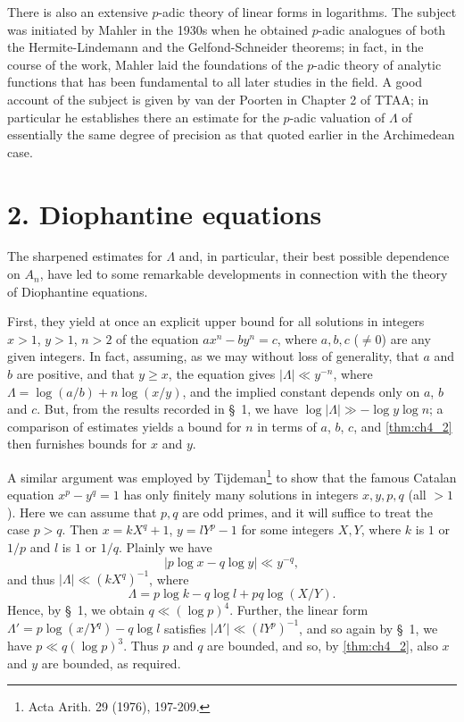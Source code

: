 There is also an extensive \(p\)-adic theory of linear forms in logarithms. The subject was initiated by Mahler in the 1930s when he obtained \(p\)-adic analogues of both the Hermite-Lindemann and the Gelfond-Schneider theorems; in fact, in the course of the work, Mahler laid the foundations of the \(p\)-adic theory of analytic functions that has been fundamental to all later studies in the field. A good account of the subject is given by van der Poorten in Chapter 2 of TTAA; in particular he establishes there an estimate for the \(p\)-adic valuation of \(\Lambda\) of essentially the same degree of precision as that quoted earlier in the Archimedean case.

\section*{2. Diophantine equations}

The sharpened estimates for \(\Lambda\) and, in particular, their best possible dependence on \(A_n\), have led to some remarkable developments in connection with the theory of Diophantine equations.

First, they yield at once an explicit upper bound for all solutions in integers \(x>1\), \(y>1\), \(n>2\) of the equation \(ax^n-by^n=c\), where \(a,b,c\) (\(\neq 0\)) are any given integers. In fact, assuming, as we may without loss of generality, that \(a\) and \(b\) are positive, and that \(y\ge x\), the equation gives \(|\Lambda|\ll y^{-n}\), where \(\Lambda=\log{(a/b)}+n\log{(x/y)}\), and the implied constant depends only on \(a\), \(b\) and \(c\). But, from the results recorded in \S~1, we have \(\log{|\Lambda|} \gg -\log{y}\log{n}\); a comparison of estimates yields a bound for \(n\) in terms of \(a\), \(b\), \(c\), and \autoref{thm:ch4_2} then furnishes bounds for \(x\) and \(y\).

A similar argument was employed by Tijdeman\footnote{Acta Arith. 29 (1976), 197-209.} to show that the famous Catalan equation \(x^p - y^q = 1\) has only finitely many solutions in integers \(x, y, p, q\) (all \({}> 1\)). Here we can assume that \(p, q\) are odd primes, and it will suffice to treat the case \(p > q\). Then \(x = kX^q + 1\), \(y = lY^p - 1\) for some integers \(X, Y\), where \(k\) is \(1\) or \(1/p\) and \(l\) is \(1\) or \(1/q\). Plainly we have
\[ |p\log x - q\log y| \ll y^{-q}, \]
and thus \(|\Lambda| \ll (kX^q)^{-1}\), where
\[ \Lambda = p \log k - q \log l + pq \log (X/Y). \]
Hence, by \S~1, we obtain \(q \ll (\log p)^4\). Further, the linear form \(\Lambda' = p \log (x/Y^q) - q \log l\) satisfies \(|\Lambda'| \ll (lY^p)^{-1}\), and so again by \S~1, we have \(p \ll q (\log p)^3\). Thus \(p\) and \(q\) are bounded, and so, by \autoref{thm:ch4_2}, also \(x\) and \(y\) are bounded, as required.


